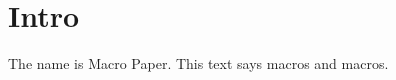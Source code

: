\documentclass{article}
\title{\PaperName}
\newcommand{\PaperName}{Macro Paper}
\newcommand{\twice}[1]{#1 and #1}
\begin{document}
\maketitle
\section{Intro}
The name is \PaperName.
This text says \twice{macros}.
\end{document}

